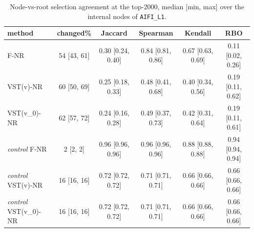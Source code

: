 \begin{table}[t]
\centering
\small
\begin{tabular}{lccccc}
\toprule
method & changed\% & Jaccard & Spearman & Kendall & RBO \\
\midrule
F-NR & 54 [43, 61] & 0.30 [0.24, 0.40] & 0.84 [0.81, 0.86] & 0.67 [0.63, 0.69] & 0.11 [0.02, 0.26] \\
VST(v)-NR & 60 [50, 69] & 0.25 [0.18, 0.33] & 0.48 [0.41, 0.68] & 0.40 [0.34, 0.56] & 0.19 [0.11, 0.62] \\
VST(v\_0)-NR & 62 [57, 72] & 0.24 [0.16, 0.28] & 0.49 [0.37, 0.73] & 0.42 [0.31, 0.64] & 0.19 [0.11, 0.61] \\
\midrule
\textit{control} F-NR & 2 [2, 2] & 0.96 [0.96, 0.96] & 0.96 [0.96, 0.96] & 0.88 [0.88, 0.88] & 0.94 [0.94, 0.94] \\
\textit{control} VST(v)-NR & 16 [16, 16] & 0.72 [0.72, 0.72] & 0.71 [0.71, 0.71] & 0.66 [0.66, 0.66] & 0.66 [0.66, 0.66] \\
\textit{control} VST(v\_0)-NR & 16 [16, 16] & 0.72 [0.72, 0.72] & 0.71 [0.71, 0.71] & 0.66 [0.66, 0.66] & 0.66 [0.66, 0.66] \\
\bottomrule
\end{tabular}
\caption{Node-vs-root selection agreement at the top-2000, median [min, max] over the internal nodes of \texttt{AIFI_L1}.}
\label{tab:hvg-summary-aifi-L1}
\end{table}